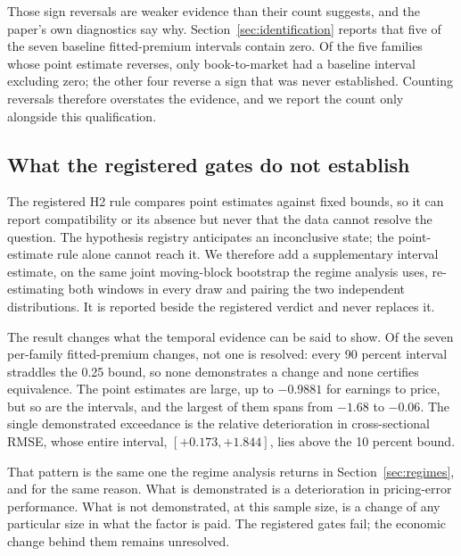 \documentclass[11pt]{article}
\begin{document}
Those sign reversals are weaker evidence than their count suggests, and the
paper's own diagnostics say why. Section~\ref{sec:identification} reports that
five of the seven baseline fitted-premium intervals contain zero. Of the five
families whose point estimate reverses, only book-to-market had a baseline
interval excluding zero; the other four reverse a sign that was never %
established. Counting reversals therefore overstates the evidence, and we report
the count only alongside this qualification.

\subsection{What the registered gates do not establish}

The registered H2 rule compares point estimates against fixed bounds, so it
can report compatibility or its absence but never that the data cannot
resolve the question. The hypothesis registry anticipates an inconclusive
state; the point-estimate rule alone cannot reach it. We therefore add a
supplementary interval estimate, on the same joint moving-block bootstrap the
regime analysis uses, re-estimating both windows in every draw and pairing
the two independent distributions. It is reported beside the registered
verdict and never replaces it.

The result changes what the temporal evidence can be said to show. Of the
seven per-family fitted-premium changes, not one is resolved: every 90 percent %
interval straddles the 0.25 bound, so none demonstrates a change and none %
certifies equivalence. The point estimates are large, up to $-0.9881$ for %
earnings to price, but so are the intervals, and the largest of them spans %
from $-1.68$ to $-0.06$. The single demonstrated exceedance is the relative %
deterioration in cross-sectional RMSE, whose entire interval, $[+0.173, %
+1.844]$, lies above the 10 percent bound. %

That pattern is the same one the regime analysis returns in
Section~\ref{sec:regimes}, and for the same reason. What is demonstrated is
a deterioration in pricing-error performance. What is not demonstrated, at
this sample size, is a change of any particular size in what the factor is
paid. The registered gates fail; the economic change behind them remains
unresolved.
\end{document}
